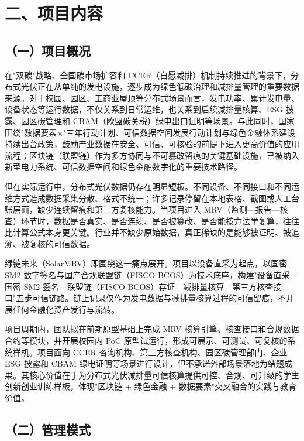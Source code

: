 \documentclass[12pt,a4paper]{article}
\begin{document}
\newpage
\section*{二、项目内容}

\subsection*{（一）项目概况}

在"双碳"战略、全国碳市场扩容和 CCER（自愿减排）机制持续推进的背景下，分布式光伏正在从单纯的发电设施，逐步成为绿色低碳治理和减排量管理的重要数据来源。对于校园、园区、工商业屋顶等分布式场景而言，发电功率、累计发电量、设备状态等运行数据，不仅关系到日常运维，也关系到后续减排量核算、ESG 披露、园区碳管理和 CBAM（欧盟碳关税）绿电出口证明等场景。与此同时，国家围绕"数据要素×"三年行动计划、可信数据空间发展行动计划与绿色金融体系建设持续出台政策，鼓励产业数据在安全、可信、可核验的前提下进入更高价值的应用流程；区块链（联盟链）作为多方协同与不可篡改留痕的关键基础设施，已被纳入新型电力系统、可信数据空间和绿色金融数字化的重要技术路径。

但在实际运行中，分布式光伏数据仍存在明显短板。不同设备、不同接口和不同运维方式造成数据采集分散、格式不统一；许多记录停留在本地表格、截图或人工台账层面，缺少连续留痕和第三方复核能力。当项目进入 MRV（监测—报告—核查）环节时，数据是否真实、是否连续、是否被篡改、是否能按方法学复算，往往比计算公式本身更关键。行业并不缺少原始数据，真正稀缺的是能够被证明、被追溯、被复核的可信数据。

绿链未来（SolarMRV）即围绕这一痛点展开。项目以设备直采为起点，以国密 SM2 数字签名与国产合规联盟链（FISCO-BCOS）为技术底座，构建"设备直采—国密 SM2 签名—联盟链（FISCO-BCOS）存证—减排量核算—第三方核查接口"五步可信链路。链上记录仅作为发电数据与减排量核算过程的可信留痕，不开展任何金融化资产发行与流转。

项目周期内，团队拟在前期原型基础上完成 MRV 核算引擎、核查接口和合规数据合约等模块，并开展校园内 PoC 原型试运行，形成可展示、可测试、可复核的系统样机。项目面向 CCER 咨询机构、第三方核查机构、园区碳管理部门、企业 ESG 披露和 CBAM 绿电证明等场景进行设计，但不承诺外部场景落地为结题成果。其核心价值在于为分布式光伏减排量可信核算提供可控、合规、可升级的学生创新创业训练样板，体现"区块链 + 绿色金融 + 数据要素"交叉融合的实践与教育价值。


\subsection*{（二）管理模式}
\end{document}
